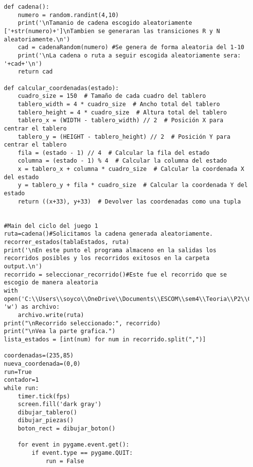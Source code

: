 \begin{lstlisting}
def cadena():
    numero = random.randint(4,10)
    print('\nTamanio de cadena escogido aleatoriamente ['+str(numero)+']\nTambien se generaran las transiciones R y N aleatoriamente.\n')
    cad = cadenaRandom(numero) #Se genera de forma aleatoria del 1-10
    print('\nLa cadena o ruta a seguir escogida aleatoriamente sera: '+cad+'\n')
    return cad

def calcular_coordenadas(estado):
    cuadro_size = 150  # Tamaño de cada cuadro del tablero
    tablero_width = 4 * cuadro_size  # Ancho total del tablero
    tablero_height = 4 * cuadro_size  # Altura total del tablero
    tablero_x = (WIDTH - tablero_width) // 2  # Posición X para centrar el tablero
    tablero_y = (HEIGHT - tablero_height) // 2  # Posición Y para centrar el tablero
    fila = (estado - 1) // 4  # Calcular la fila del estado
    columna = (estado - 1) % 4  # Calcular la columna del estado
    x = tablero_x + columna * cuadro_size  # Calcular la coordenada X del estado
    y = tablero_y + fila * cuadro_size  # Calcular la coordenada Y del estado
    return ((x+33), y+33)  # Devolver las coordenadas como una tupla


#Main del ciclo del juego 1
ruta=cadena()#Solicitamos la cadena generada aleatoriamente.
recorrer_estados(tablaEstados, ruta)
print('\nEn este punto el programa almaceno en la salidas los recorridos posibles y los recorridos exitosos en la carpeta output.\n')
recorrido = seleccionar_recorrido()#Este fue el recorrido que se escogio de manera aleatoria
with open('C:\\Users\\soyco\\OneDrive\\Documents\\ESCOM\\sem4\\Teoria\\P2\\Chess\\output\\ruta_blanca.txt', 'w') as archivo:
    archivo.write(ruta)
print("\nRecorrido seleccionado:", recorrido)
print("\nVea la parte grafica.")
lista_estados = [int(num) for num in recorrido.split(",")]

coordenadas=(235,85)
nueva_coordenada=(0,0)
run=True
contador=1
while run:
    timer.tick(fps)
    screen.fill('dark gray')
    dibujar_tablero()
    dibujar_piezas()
    boton_rect = dibujar_boton()

    for event in pygame.event.get():
        if event.type == pygame.QUIT:
            run = False


\end{lstlisting}
